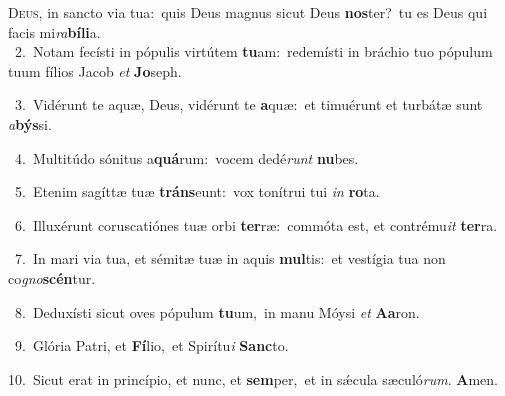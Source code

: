 \lettrine{\initial\textcolor{\initialcolor}{D}}{eus,} in sancto via tua:~\dagger quis Deus magnus sicut Deus \textbf{nos}\-ter?~\star tu es Deus qui facis mi\-\textit{ra}\-\textbf{bí}\textbf{li}a.\\
{\numbfont\textcolor{\numbcolor}{~2.}}~Notam fecísti in pópulis virtútem \textbf{tu}\-am:~\star redemísti in bráchio tuo pópulum tuum fílios Jacob \textit{et} \textbf{Jo}\-seph.\par
{\numbfont\textcolor{\numbcolor}{~3.}}~Vidérunt te aquæ, Deus, vidérunt te \textbf{a}\-quæ:~\star et timuérunt et turbátæ sunt \textit{a}\-\textbf{býs}si.\par
{\numbfont\textcolor{\numbcolor}{~4.}}~Multitúdo sónitus a\-\textbf{quá}\-rum:~\star vocem dedé\textit{runt} \textbf{nu}\-bes.\par
{\numbfont\textcolor{\numbcolor}{~5.}}~Etenim sagíttæ tuæ \textbf{tráns}\-eunt:~\star vox tonítrui tui \textit{in} \textbf{ro}\-ta.\par
{\numbfont\textcolor{\numbcolor}{~6.}}~Illuxérunt coruscatiónes tuæ orbi \textbf{ter}\-ræ:~\star commóta est, et contrému\textit{it} \textbf{ter}\-ra.\par
{\numbfont\textcolor{\numbcolor}{~7.}}~In mari via tua, et sémitæ tuæ in aquis \textbf{mul}\-tis:~\star et vestígia tua non co\-\textit{gno}\-\textbf{scén}tur.\par
{\numbfont\textcolor{\numbcolor}{~8.}}~Deduxísti sicut oves pópulum \textbf{tu}\-um,~\star in manu Móysi \textit{et} \textbf{A}\-\textbf{a}ron.\par
{\numbfont\textcolor{\numbcolor}{~9.}}~Glória Patri, et \textbf{Fí}\-lio,~\star et Spirítu\textit{i} \textbf{Sanc}\-to.\par
{\numbfont\textcolor{\numbcolor}{10.}}~Sicut erat in princípio, et nunc, et \textbf{sem}\-per,~\star et in sǽcula sæculó\-\textit{rum}\-. \textbf{A}\-men.\par
